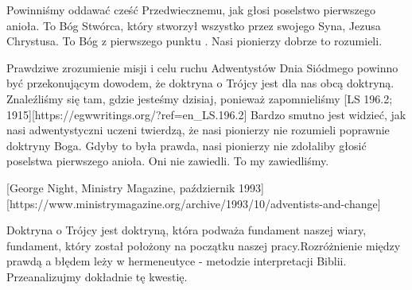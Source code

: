 Powinniśmy oddawać cześć Przedwiecznemu, jak głosi poselstwo pierwszego anioła. To Bóg Stwórca, który stworzył wszystko przez swojego Syna, Jezusa Chrystusa. To Bóg z pierwszego punktu . Nasi pionierzy dobrze to rozumieli.

Prawdziwe zrozumienie misji i celu ruchu Adwentystów Dnia Siódmego powinno być przekonującym dowodem, że doktryna o Trójcy jest dla nas obcą doktryną. Znaleźliśmy się tam, gdzie jesteśmy dzisiaj, ponieważ zapomnieliśmy [LS 196.2; 1915][https://egwwritings.org/?ref=en\_LS.196.2] Bardzo smutno jest widzieć, jak nasi adwentystyczni uczeni twierdzą, że nasi pionierzy nie rozumieli poprawnie doktryny Boga. Gdyby to była prawda, nasi pionierzy nie zdołaliby głosić poselstwa pierwszego anioła. Oni nie zawiedli. To my zawiedliśmy.

[George Night, Ministry Magazine, październik 1993][https://www.ministrymagazine.org/archive/1993/10/adventists-and-change]

Doktryna o Trójcy jest doktryną, która podważa fundament naszej wiary, fundament, który został położony na początku naszej pracy.Rozróżnienie między prawdą a błędem leży w hermeneutyce - metodzie interpretacji Biblii. Przeanalizujmy dokładnie tę kwestię.


% 

% 